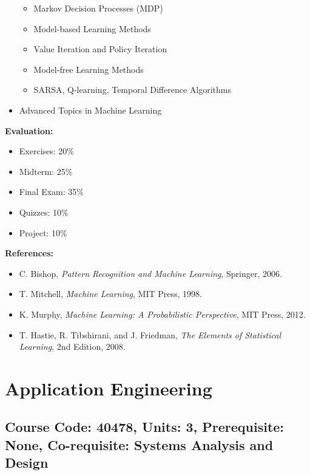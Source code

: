 \documentclass[12pt]{article}
\begin{document}
\begin{itemize}
    \begin{itemize}
        \item Markov Decision Processes (MDP)
        \item Model-based Learning Methods
        \item Value Iteration and Policy Iteration
        \item Model-free Learning Methods
        \item SARSA, Q-learning, Temporal Difference Algorithms
    \end{itemize}
    \item Advanced Topics in Machine Learning
\end{itemize}

\textbf{Evaluation:}
\begin{itemize}
    \item Exercises: 20\%
    \item Midterm: 25\%
    \item Final Exam: 35\%
    \item Quizzes: 10\%
    \item Project: 10\%
\end{itemize}

\textbf{References:}
\begin{itemize}
    \item C. Bishop, \textit{Pattern Recognition and Machine Learning}, Springer, 2006.
    \item T. Mitchell, \textit{Machine Learning}, MIT Press, 1998.
    \item K. Murphy, \textit{Machine Learning: A Probabilistic Perspective}, MIT Press, 2012.
    \item T. Hastie, R. Tibshirani, and J. Friedman, \textit{The Elements of Statistical Learning}, 2nd Edition, 2008.
\end{itemize}

\newpage

\section{Application Engineering}
\subsection*{Course Code: 40478, Units: 3, Prerequisite: None, Co-requisite: Systems Analysis and Design}
\end{document}
